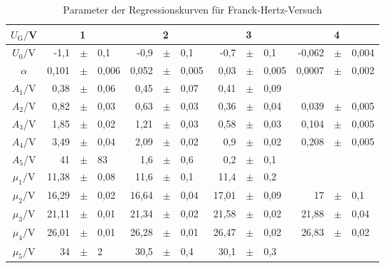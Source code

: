   \begin{table}[h]
    \centering
    \caption{Parameter der Regressionskurven für Franck-Hertz-Versuch}
    \label{tab:fh_parameter_1}
    \begin{tabular}{c | r p{0.05cm} l r p{0.05cm} l r p{0.05cm} l r p{0.05cm} l}
      \toprule
       $U_\mathrm{G}/$V & & 1 & & & 2 & & & 3 & & & 4 &\\  
      \midrule
      $U_0/$V &              -1,1         &$\pm$ & 0,1      &   -0,9        &$\pm$ & 0,1     & -0,7  & $\pm$ &  0,1  &  -0,062  & $\pm$  & 0,004 \\    
      $\alpha$ & 0,101         &$\pm$ & 0,006    &  0,052        &$\pm$ & 0,005    & 0,03  & $\pm$ & 0,005   &   0,0007 & $\pm$  & 0,002 \\
      $A_1$/V &              0,38         &$\pm$ & 0,06     &   0,45          &$\pm$ & 0,07    & 0,41  & $\pm$ &  0,09  &    &   &  \\ 
      $A_2$/V &              0,82         &$\pm$ & 0,03     &   0,63         &$\pm$ & 0,03    &  0,36 & $\pm$ & 0,04   &  0,039  & $\pm$  & 0,005 \\ 
      $A_3$/V &             1,85          &$\pm$ & 0,02     &   1,21          &$\pm$ & 0,03    & 0,58  & $\pm$ & 0,03   &  0,104  & $\pm$  & 0,005 \\ 
      $A_4$/V &              3,49          &$\pm$ & 0,04     &   2,09          &$\pm$ & 0,02    & 0,9  & $\pm$ &  0,02  &  0,208  & $\pm$  & 0,005 \\ 
      $A_5$/V &              41          &$\pm$ & 83       &   1,6          &$\pm$ & 0,6     & 0,2  & $\pm$ & 0,1   &    &  &  \\ 
      $\mu_1/$V &            11,38          &$\pm$ & 0,08     &   11,6            &$\pm$ & 0,1     & 11,4  & $\pm$ & 0,2   &    &   &  \\ 
      $\mu_2/$V &           16,29          &$\pm$ & 0,02     &  16,64          &$\pm$ & 0,04    &  17,01 & $\pm$ & 0,09   &  17  & $\pm$  & 0,1 \\ 
      $\mu_3/$V &            21,11           &$\pm$ & 0,01      &   21,34           &$\pm$ & 0,02     & 21,58  & $\pm$ & 0,02   &   21,88 & $\pm$  & 0,04 \\ 
      $\mu_4/$V &            26,01          &$\pm$ & 0,01    &   26,28          &$\pm$ & 0,01   & 26,47  & $\pm$ & 0,02   &  26,83  & $\pm$ & 0,02 \\ 
      $\mu_5/$V &            34          &$\pm$ & 2       &   30,5          &$\pm$ & 0,4     & 30,1  & $\pm$ &  0,3  &    &  &  \\ 

\end{tabular}
\end{table}
